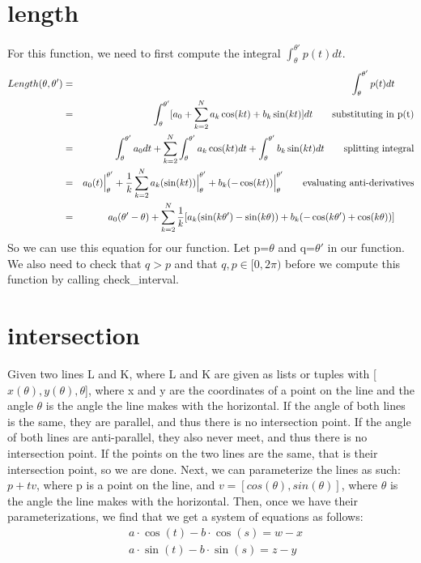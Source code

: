\documentclass{article}
\begin{document}
\section*{length}
For this function, we need to first compute the integral $\int_{\theta}^{\theta'} p(t)dt$.
\begin{eqnarray*}
     Length(\theta,\theta')
      & = & \int_\theta^{\theta'} p(t)dt
            ~~~~~~ \mbox{\rm } \\
      & = & \int_\theta^{\theta'} [a_0 +\sum_{k=2}^{N} a_k\cos(kt)+b_k\sin(kt)]dt
            ~~~~~~ \mbox{\rm substituting in p(t)} \\
      & = & \int_\theta^{\theta'} a_0 dt +\sum_{k=2}^{N} \int_\theta^{\theta'}a_k\cos(kt)dt+ \int_\theta^{\theta'}b_k\sin(kt)dt
            ~~~~~~ \mbox{\rm splitting integral} \\
      & = & a_0(t)\Big|_\theta^{\theta'} +\frac{1}{k}\sum_{k=2}^{N} a_k(\sin(kt))\Big|_\theta^{\theta'}+ b_k(-\cos(kt))\Big|_\theta^{\theta'}
            ~~~~~~ \mbox{\rm evaluating anti-derivatives} \\
      & = & a_0(\theta' - \theta) +\sum_{k=2}^{N} \frac{1}{k}[a_k(\sin(k\theta') - \sin(k\theta))+ b_k(-\cos(k\theta')+\cos(k\theta))]
            ~~~~~~ \mbox{\rm } \\
\end{eqnarray*}
So we can use this equation for our function. Let p=$\theta$ and q=$\theta'$ in our function. We also need to check that $q>p$ and that $q,p \in [0,2\pi)$ before we compute this function by calling check\_interval.


\section*{intersection}
Given two lines L and K, where L and K are given as lists or tuples with [$x(\theta), y(\theta), \theta$], where x and y are the coordinates of a point on the line and the angle $\theta$ is the angle the line makes with the horizontal. If the angle of both lines is the same, they are parallel, and thus there is no intersection point. If the angle of both lines are anti-parallel, they also never meet, and thus there is no intersection point. If the points on the two lines are the same, that is their intersection point, so we are done. 
Next, we can parameterize the lines as such: $p+tv$, where p is a point on the line, and $v=[cos(\theta), sin(\theta)]$, where $\theta$ is the angle the line makes with the horizontal. Then, once we have their parameterizations, we find that we get a system of equations as follows:
\begin{eqnarray*}
      & a\cdot \cos(t)-b\cdot \cos(s)=w-x \\
      & a\cdot \sin(t)-b\cdot \sin(s)=z-y
\end{eqnarray*}
\end{document}
